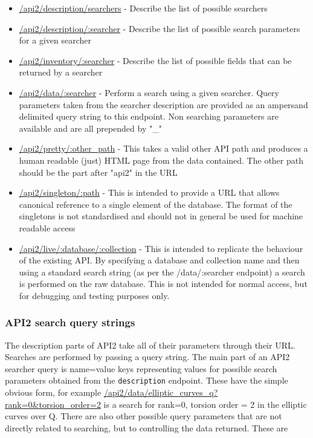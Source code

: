 \documentclass[11pt]{article}
\begin{document}
\begin{itemize}
\item \url{/api2/description/searchers} - Describe the list of possible searchers
\item \url{/api2/description/:searcher} - Describe the list of possible search parameters for a given searcher
\item \url{/api2/inventory/:searcher} - Describe the list of possible fields that can be returned by a searcher
\item \url{/api2/data/:searcher} - Perform a search using a given searcher. Query parameters taken from the searcher description are provided as an ampersand delimited query string to this endpoint. Non searching parameters are available and are all prepended by "\_"
\item \url{/api2/pretty/:other_path} - This takes a valid other API path and produces a human readable (just) HTML page from the data contained. The other path should be the part after "api2" in the URL
\item \url{/api2/singleton/:path} - This is intended to provide a URL that allows canonical reference to a single element of the database. The format of the singletons is not standardised and should not in general be used for machine readable access
\item \url{/api2/live/:database/:collection} - This is intended to replicate the behaviour of the existing API. By specifying a database and collection name and then using a standard search string (as per the /data/:searcher endpoint) a search is performed on the raw database. This is not intended for normal access, but for debugging and testing purposes only.
\end{itemize}

\subsubsection{API2 search query strings}
The description parts of API2 take all of their parameters through their URL. Searches are performed by passing a query string. The main part of an API2 searcher query is name=value keys representing values for possible search parameters obtained from the \texttt{description} endpoint. These have the simple obvious form, for example \url{/api2/data/elliptic_curves_q?rank=0&torsion_order=2} is a search for rank=0, torsion order = 2 in the elliptic curves over Q. There are also other possible query parameters that are not directly related to searching, but to controlling the data returned. These are
\end{document}
